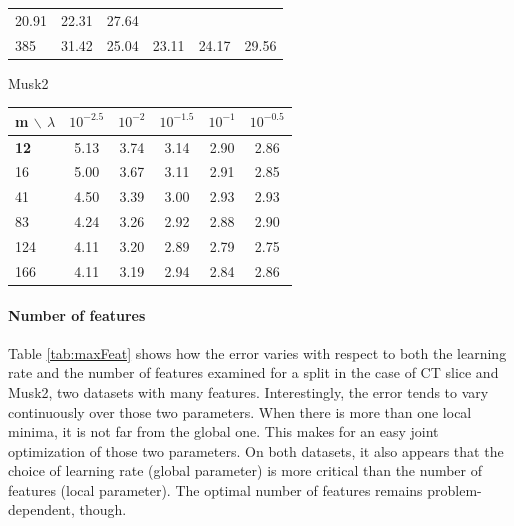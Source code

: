 \documentclass{article}
\begin{document}
\begin{table}[t]
\begin{center}
\begin{small}
\begin{tabular}{l|ccccc}
\cellcolor[gray]{0.89} 20.91 & \cellcolor[gray]{0.83} 22.31 & 
\cellcolor[gray]{0.58} 27.64 \\
385 & \cellcolor[gray]{0.40} 31.42 & \cellcolor[gray]{0.70} 25.04 & 
\cellcolor[gray]{0.79} 23.11 & \cellcolor[gray]{0.74} 24.17 & 
\cellcolor[gray]{0.49} 29.56 \\
\hline
\end{tabular}
\par
Musk2\\
\begin{tabular}{l|ccccc}
\hline
m $\backslash$ $\lambda$  &  $10^{-2.5}$ & $10^{-2}$ & $10^{-1.5}$ & 
$10^{-1}$ & $10^{-0.5}$ \\
\hline
{\bf 12} & \cellcolor[gray]{0.40} 5.13 & \cellcolor[gray]{0.75} 3.74 & 
\cellcolor[gray]{0.90} 3.14 & \cellcolor[gray]{0.96} 2.90 & 
\cellcolor[gray]{0.97} 2.86 \\
16 & \cellcolor[gray]{0.43} 5.00 & \cellcolor[gray]{0.77} 3.67 & 
\cellcolor[gray]{0.91} 3.11 & \cellcolor[gray]{0.96} 2.91 & 
\cellcolor[gray]{0.97} 2.85 \\
41 & \cellcolor[gray]{0.56} 4.50 & \cellcolor[gray]{0.84} 3.39 & 
\cellcolor[gray]{0.94} 3.00 & \cellcolor[gray]{0.95} 2.93 & 
\cellcolor[gray]{0.96} 2.93 \\
83 & \cellcolor[gray]{0.62} 4.24 & \cellcolor[gray]{0.87} 3.26 & 
\cellcolor[gray]{0.96} 2.92 & \cellcolor[gray]{0.97} 2.88 & 
\cellcolor[gray]{0.96} 2.90 \\
124 & \cellcolor[gray]{0.66} 4.11 & \cellcolor[gray]{0.89} 3.20 & 
\cellcolor[gray]{0.96} 2.89 & \cellcolor[gray]{0.99} 2.79 & 
\cellcolor[gray]{1.00} 2.75 \\
166 & \cellcolor[gray]{0.66} 4.11 & \cellcolor[gray]{0.89} 3.19 & 
\cellcolor[gray]{0.95} 2.94 & \cellcolor[gray]{0.98} 2.84 & 
\cellcolor[gray]{0.97} 2.86 \\
\hline
\end{tabular}
\end{small}
\end{center}
\vskip -0.1in
\end{table}

\paragraph{Number of features}
Table \ref{tab:maxFeat} shows how the error varies with respect to both the 
learning rate and the number of features examined for a split in the case of CT 
slice and Musk2, two datasets with many features. 
Interestingly, the error tends to vary continuously over those two parameters. 
When there is more than one local minima, it is not far from the global one. 
This makes for an easy joint optimization of those two parameters. 
On both datasets, it also appears that the choice of learning rate (global 
parameter) is more critical than the number of features (local parameter). The 
optimal number of features remains problem-dependent, though. 
\end{document}
